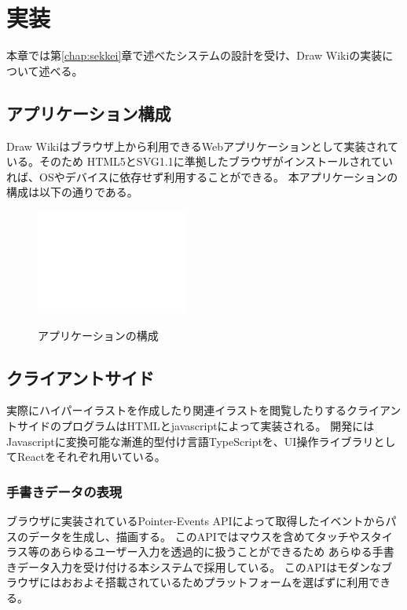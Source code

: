 \chapter{実装}
\label{chap:jissou}

本章では第\ref{chap:sekkei}章で述べたシステムの設計を受け、Draw Wikiの実装について述べる。

\newpage

\section{アプリケーション構成}
Draw Wikiはブラウザ上から利用できるWebアプリケーションとして実装されている。そのため
HTML5とSVG1.1に準拠したブラウザがインストールされていれば、OSやデバイスに依存せず利用することができる。
本アプリケーションの構成は以下の通りである。

\begin{figure}[htbp]
    \begin{center}
    {\includegraphics[width=50mm]{images/testimage.png}} \end{center}
    \caption{アプリケーションの構成}
\end{figure}

\section{クライアントサイド}
実際にハイパーイラストを作成したり関連イラストを閲覧したりするクライアントサイドのプログラムはHTMLとjavascriptによって実装される。
開発にはJavascriptに変換可能な漸進的型付け言語TypeScriptを、UI操作ライブラリとしてReactをそれぞれ用いている。

\subsection{手書きデータの表現}
ブラウザに実装されているPointer-Events APIによって取得したイベントからパスのデータを生成し、描画する。
このAPIではマウスを含めてタッチやスタイラス等のあらゆるユーザー入力を透過的に扱うことができるため
あらゆる手書きデータ入力を受け付ける本システムで採用している。
このAPIはモダンなブラウザにはおおよそ搭載されているためプラットフォームを選ばずに利用できる。

